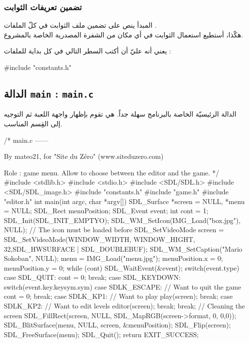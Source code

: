 \subsubsection{تضمين تعريفات الثوابت}

المبدأ ينص على تضمين ملف الثوابت في كلّ الملفات
.\\
هكّذا، أستطيع استعمال الثوابت في أي مكان من الشفرة المصدرية الخاصة بالمشروع.

يعني أنه عليّ أن أكتب السطر التالي في كل بداية للملفات 
 :

\begin{Csource}
#include "constants.h"
\end{Csource}

\subsection{الدالة \texttt{main} : \texttt{main.c}}

الدالة الرئيسيّة الخاصة بالبرنامج سهلة جداً. هي تقوم بإظهار واجهة اللعبة ثم التوجيه إلى القِسم المناسب.

\begin{Csource}
/*
main.c
------

By mateo21, for "Site du Zéro" (www.siteduzero.com)

Role : game menu. Allow to choose between the editor and the game.
*/
#include <stdlib.h>
#include <stdio.h>
#include <SDL/SDL.h>
#include <SDL/SDL_image.h>
#include "constants.h"
#include "game.h"
#include "editor.h"
int main(int argc, char *argv[])
{
	SDL_Surface *screen = NULL, *menu = NULL;
	SDL_Rect menuPosition;
	SDL_Event event;
	int cont = 1;
	SDL_Init(SDL_INIT_EMPTYO);
	SDL_WM_SetIcon(IMG_Load("box.jpg"), NULL); // The icon must be loaded before SDL_SetVideoMode
	screen = SDL_SetVideoMode(WINDOW_WIDTH, WINDOW_HIGHT, 32,SDL_HWSURFACE | SDL_DOUBLEBUF);
	SDL_WM_SetCaption("Mario Sokoban", NULL);
	menu = IMG_Load("menu.jpg");
	menuPosition.x = 0;
	menuPosition.y = 0;
	while (cont)
	{
		SDL_WaitEvent(&event);
		switch(event.type)
		{
			case SDL_QUIT:
			cont = 0;
			break;
			case SDL_KEYDOWN:
			switch(event.key.keysym.sym)
			{
				case SDLK_ESCAPE: // Want to quit the game
				cont = 0;
				break;
				case SDLK_KP1: // Want to play
				play(screen);
				break;
				case SDLK_KP2: // Want to edit levels
				editor(screen);
				break;
			}
			break;
		}
		// Cleaning the screen
		SDL_FillRect(screen, NULL, SDL_MapRGB(screen->format, 0, 0,0));
		SDL_BlitSurface(menu, NULL, screen, &menuPosition);
		SDL_Flip(screen);
	}
	SDL_FreeSurface(menu);
	SDL_Quit();
	return EXIT_SUCCESS;
}
\end{Csource}

